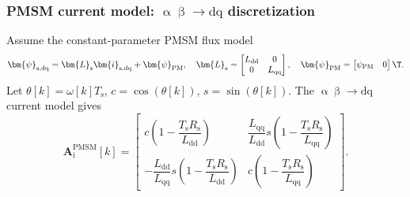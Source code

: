 \begin{frame}
	\frametitle{PMSM current model: $\upalpha\upbeta\rightarrow \mathrm{dq}$ discretization}
	Assume the constant-parameter PMSM flux model
	\begin{equation*}
		\bm{\psi}_{\mathrm{s},\mathrm{dq}}=
		\bm{L}_{\mathrm{s}}\bm{i}_{\mathrm{s},\mathrm{dq}}+\bm{\psi}_{\mathrm{PM}},
		\quad
		\bm{L}_{\mathrm{s}}=\begin{bmatrix}L_{\mathrm{dd}}&0\\0&L_{\mathrm{qq}}\end{bmatrix},
		\quad
		\bm{\psi}_{\mathrm{PM}}=\begin{bmatrix}\psi_{\mathrm{PM}}&0\end{bmatrix}\T .
	\end{equation*}\pause%
	Let $\theta[k]=\omega[k]T_{\mathrm{s}}$, $c=\cos(\theta[k])$, $s=\sin(\theta[k])$. The $\upalpha\upbeta\rightarrow \mathrm{dq}$ current model gives
	\begin{equation*}
		\bm{A}_{\mathrm{i}}^{\mathrm{PMSM}}[k]=
		\begin{bmatrix}
			c\left(1-\dfrac{T_{\mathrm{s}}R_{\mathrm{s}}}{L_{\mathrm{dd}}}\right)                                          &
			\dfrac{L_{\mathrm{qq}}}{L_{\mathrm{dd}}}s\left(1-\dfrac{T_{\mathrm{s}}R_{\mathrm{s}}}{L_{\mathrm{qq}}}\right)    \\[4mm]
			-\dfrac{L_{\mathrm{dd}}}{L_{\mathrm{qq}}}s\left(1-\dfrac{T_{\mathrm{s}}R_{\mathrm{s}}}{L_{\mathrm{dd}}}\right) &
			c\left(1-\dfrac{T_{\mathrm{s}}R_{\mathrm{s}}}{L_{\mathrm{qq}}}\right)
		\end{bmatrix}.
	\end{equation*}
\end{frame}

